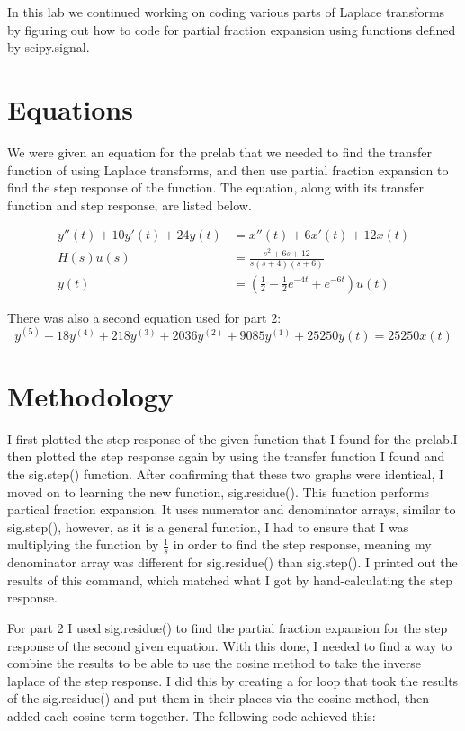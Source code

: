 \documentclass[12pt]{report}
\begin{document}
In this lab we continued working on coding various parts of Laplace transforms by figuring out how to code for partial fraction expansion using functions defined by scipy.signal. 

\section{Equations}

We were given an equation for the prelab that we needed to find the transfer function of using Laplace transforms, and then use partial fraction expansion to find the step response of the function. The equation, along with its transfer function and step response, are listed below.

\begin{align*}
    y''(t) + 10y'(t) + 24y(t) &= x''(t) + 6x'(t) + 12x(t) \\
    H(s)u(s) &= \frac{s^2 + 6s + 12}{s(s+4)(s+6)} \\
    y(t) &= \left(\frac{1}{2} -\frac{1}{2}e^{-4t} + e^{-6t}\right)u(t)
\end{align*}

There was also a second equation used for part 2:
$$y^{(5)} + 18y^{(4)} + 218y^{(3)} + 2036y^{(2)} + 9085y^{(1)} + 25250y(t) = 25250x(t)$$


 \section{Methodology}
 
 I first plotted the step response of the given function that I found for the prelab.I then plotted the step response again by using the transfer function I found and the sig.step() function. After confirming that these two graphs were identical, I moved on to learning the new function, sig.residue(). This function performs partical fraction expansion. It uses numerator and denominator arrays, similar to sig.step(), however, as it is a general function, I had to ensure that I was multiplying the function by $\frac{1}{s}$ in order to find the step response, meaning my denominator array was different for sig.residue() than sig.step(). I printed out the results of this command, which matched what I got by hand-calculating the step response.
 
 \newpage
 For part 2 I used sig.residue() to find the partial fraction expansion for the step response of the second given equation. With this done, I needed to find a way to combine the results to be able to use the cosine method to take the inverse laplace of the step response. I did this by creating a for loop that took the results of the sig.residue() and put them in their places via the cosine method, then added each cosine term together. The following code achieved this:
 
\end{document}
